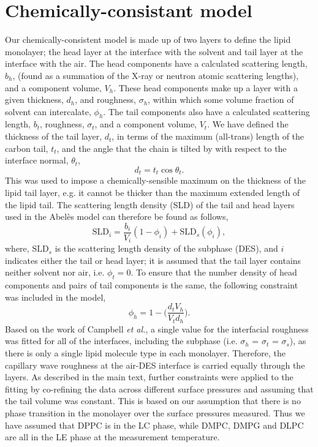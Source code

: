 \documentclass[11pt,a4paper]{paper}
\begin{document}
\section{Chemically-consistant model}
Our chemically-consistent model is made up of two layers to define the lipid monolayer; the head layer at the interface with the solvent and tail layer at the interface with the air. The head components have a calculated scattering length, $b_h$, (found as a summation of the X-ray or neutron atomic scattering lengths), and a component volume, $V_h$. These head components make up a layer with a given thickness, $d_h$, and roughness, $\sigma_h$, within which some volume fraction of solvent can intercalate, $\phi_h$. The tail components also have a calculated scattering length, $b_t$, roughness, $\sigma_t$, and a component volume, $V_t$. We have defined the thickness of the tail layer, $d_t$, in terms of the maximum (all-trans) length of the carbon tail, $t_t$, and the angle that the chain is tilted by with respect to the interface normal, $\theta_t$,
%
\begin{equation}
\label{equ:tl}
d_t = t_t \cos{\theta_t}.
\end{equation}
%
This was used to impose a chemically-sensible maximum on the thickness of the lipid tail layer, e.g. it cannot be thicker than the maximum extended length of the lipid tail. The scattering length density (SLD) of the tail and head layers used in the Abel\`{e}s model can therefore be found as follows,
%
\begin{equation}
\text{SLD}_i = \frac{b_i}{V_i}(1 - \phi_i) + \text{SLD}_{s}(\phi_i),
\end{equation}
%
where, $\text{SLD}_{s}$ is the scattering length density of the subphase (DES), and $i$ indicates either the tail or head layer; it is assumed that the tail layer contains neither solvent nor air, i.e. $\phi_t = 0$. To ensure that the number density of head components and pairs of tail components is the same, the following constraint was included in the model,\cite{Braun2017}
%
\begin{equation}
\label{equ:phih}
\phi_h =  1 - \bigg(\frac{d_tV_h}{V_td_h}\bigg).
\end{equation}
%
Based on the work of Campbell \emph{et al.},\cite{Campbell2018} a single value for the interfacial roughness was fitted for all of the interfaces, including the subphase (i.e. $\sigma_h$ = $\sigma_t$ = $\sigma_s$), as there is only a single lipid molecule type in each monolayer. Therefore, the capillary wave roughness at the air-DES interface is carried equally through the layers.
As described in the main text, further constraints were applied to the fitting by co-refining the data across different surface pressures and assuming that the tail volume was constant. This is based on our assumption that there is no phase transition in the monolayer over the surface pressures measured. Thus we have assumed that DPPC is in the LC phase, while DMPC, DMPG and DLPC are all in the LE phase at the measurement temperature.
\end{document}
